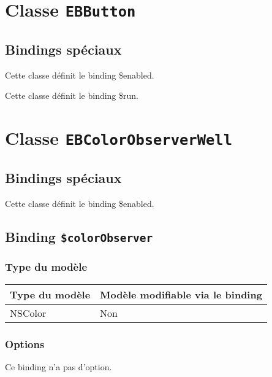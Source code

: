 \section{Classe \texttt{EBButton}}

\subsection{Bindings spéciaux}

Cette classe définit le binding \$enabled.

Cette classe définit le binding \$run.








\section{Classe \texttt{EBColorObserverWell}}

\subsection{Bindings spéciaux}

Cette classe définit le binding \$enabled.

\subsection{Binding \texttt{\$colorObserver}}

\subsubsection{Type du modèle}

\begin{tabular}{|l|l|}
\hline
\textbf{Type du modèle} & \textbf{Modèle modifiable via le binding}\\
\hline
NSColor & Non\\
\hline
\end{tabular}
\subsubsection{Options}

Ce binding n'a pas d'option.








